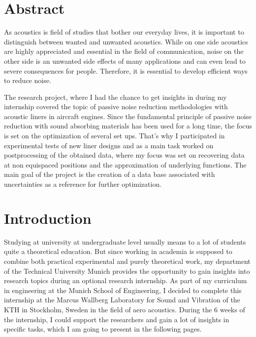 \documentclass{article}
\begin{document}
\maketitle
{}
\newpage
{}

\setcounter{secnumdepth}{5}

\section{Abstract}
As acoustics is field of studies that bother our everyday lives, it is important to distinguish between wanted and unwanted acoustics.
While on one side acoustics are highly appreciated and essential in the field of communication, noise on the other side is an unwanted side effects of many applications and can even lead to severe consequences for people.
Therefore, it is essential to develop efficient ways to reduce noise.

The research project, where I had the chance to get insights in during my internship covered the topic of passive noise reduction methodologies with acoustic liners in aircraft engines.
Since the fundamental principle of passive noise reduction with sound absorbing materials has been used for a long time, the focus is set on the optimization of several set ups.
That’s why I participated in experimental tests of new liner designs and as a main task worked on postprocessing of the obtained data, where my focus was set on recovering data at non equispaced positions and the approximation of underlying functions.
The main goal of the project is the creation of a data base associated with uncertainties as a reference for further optimization.  

\newpage 

\section{Introduction} 
Studying at university at undergraduate level usually means to a lot of students quite a theoretical education.
But since working in academia is supposed to combine both practical experimental and purely theoretical work, my department of the Technical University Munich provides the opportunity to gain insights into research topics during an optional research internship.
As part of my curriculum in engineering at the Munich School of Engineering, I decided to complete this internship at the Marcus Wallberg Laboratory for Sound and Vibration of the KTH in Stockholm, Sweden in the field of aero acoustics.
During the 6 weeks of the internship, I could support the researchers and gain a lot of insights in specific tasks, which I am going to present in the following pages.  
\end{document}
